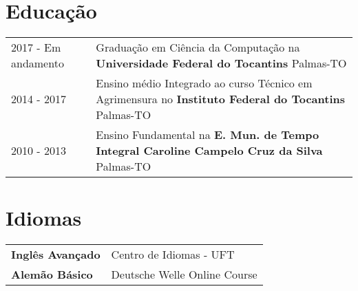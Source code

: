 \documentclass[a4paper,12pt]{article}
\begin{document}
\section{Educação}
\begin{tabularx}{\linewidth}{@{}l X@{}}	
2017 - Em andamento & Graduação em Ciência da Computação na \textbf{Universidade Federal do Tocantins} \hfill Palmas-TO \\

2014 - 2017 & Ensino médio Integrado ao curso Técnico em Agrimensura no \textbf{Instituto Federal do Tocantins} \hfill Palmas-TO \\ 

2010 - 2013 & Ensino Fundamental na \textbf{E. Mun. de Tempo Integral Caroline Campelo Cruz da Silva} \hfill Palmas-TO \\ 
\end{tabularx}


\section{Idiomas}
\begin{tabularx}{\linewidth}{@{}l X@{}}
\textbf{Inglês Avançado} & \hfill Centro de Idiomas - UFT \\
\textbf{Alemão Básico} & \hfill  Deutsche Welle Online Course \\  
\end{tabularx}


\end{document}
